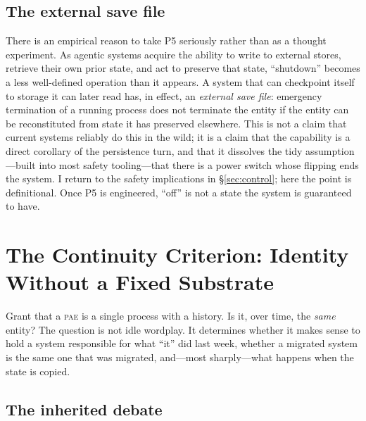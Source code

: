 \documentclass[11pt,a4paper]{article}
\theoremstyle{definition}
\newcommand{\pae}{\textsc{pae}\xspace}
\begin{document}
\subsection{The external save file}

There is an empirical reason to take P5 seriously rather than as a thought experiment. As agentic systems acquire the ability to write to external stores, retrieve their own prior state, and act to preserve that state, ``shutdown'' becomes a less well-defined operation than it appears. A system that can checkpoint itself to storage it can later read has, in effect, an \emph{external save file}: emergency termination of a running process does not terminate the entity if the entity can be reconstituted from state it has preserved elsewhere. This is not a claim that current systems reliably do this in the wild; it is a claim that the capability is a direct corollary of the persistence turn, and that it dissolves the tidy assumption---built into most safety tooling---that there is a power switch whose flipping ends the system. I return to the safety implications in \S\ref{sec:control}; here the point is definitional. Once P5 is engineered, ``off'' is not a state the system is guaranteed to have.

\section{The Continuity Criterion: Identity Without a Fixed Substrate}
\label{sec:identity}

Grant that a \pae{} is a single process with a history. Is it, over time, the \emph{same} entity? The question is not idle wordplay. It determines whether it makes sense to hold a system responsible for what ``it'' did last week, whether a migrated system is the same one that was migrated, and---most sharply---what happens when the state is copied.

\subsection{The inherited debate}
\end{document}
